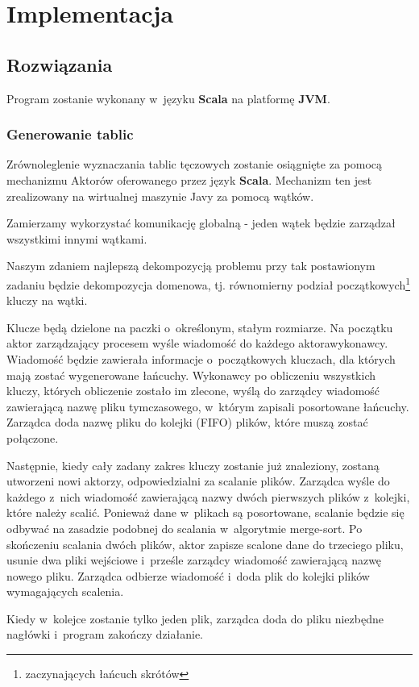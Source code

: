 \documentclass[a4paper]{scrartcl}
\begin{document}
\section{Implementacja}
\subsection{Rozwiązania}
Program zostanie wykonany w~języku \textbf{Scala} na platformę \textbf{JVM}.

\subsubsection{Generowanie tablic}
Zrównoleglenie wyznaczania tablic tęczowych zostanie osiągnięte za pomocą mechanizmu Aktorów oferowanego przez język \textbf{Scala}.
Mechanizm ten jest zrealizowany na wirtualnej maszynie Javy za pomocą wątków.

Zamierzamy wykorzystać komunikację globalną - jeden wątek będzie zarządzał wszystkimi innymi wątkami.

Naszym zdaniem najlepszą dekompozycją problemu przy tak postawionym zadaniu będzie dekompozycja domenowa, tj. równomierny podział początkowych\footnote{zaczynających łańcuch skrótów} kluczy na wątki.

Klucze będą dzielone na paczki o~określonym, stałym rozmiarze. Na początku aktor zarządzający procesem wyśle wiadomość do każdego aktora\dywiz wykonawcy.
Wiadomość będzie zawierała informacje o~początkowych kluczach, dla których mają zostać wygenerowane łańcuchy.
Wykonawcy po obliczeniu wszystkich kluczy, których obliczenie zostało im zlecone, wyślą do zarządcy wiadomość zawierającą nazwę pliku tymczasowego, w~którym zapisali posortowane łańcuchy.
Zarządca doda nazwę pliku do kolejki (FIFO) plików, które muszą zostać połączone.

Następnie, kiedy cały zadany zakres kluczy zostanie już znaleziony, zostaną utworzeni nowi aktorzy, odpowiedzialni za scalanie plików.
Zarządca wyśle do każdego z~nich wiadomość zawierającą nazwy dwóch pierwszych plików z~kolejki, które należy scalić.
Ponieważ dane w~plikach są posortowane, scalanie będzie się odbywać na zasadzie podobnej do scalania w~algorytmie merge-sort.
Po skończeniu scalania dwóch plików, aktor zapisze scalone dane do trzeciego pliku, usunie dwa pliki wejściowe i~prześle zarządcy wiadomość zawierającą nazwę nowego pliku.
Zarządca odbierze wiadomość i~doda plik do kolejki plików wymagających scalenia.

Kiedy w~kolejce zostanie tylko jeden plik, zarządca doda do pliku niezbędne nagłówki i~program zakończy działanie.
\end{document}
